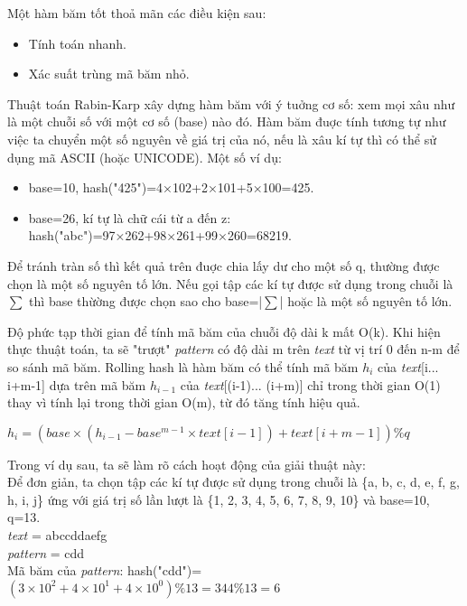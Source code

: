 \documentclass[a4paper,11pt]{article}
\begin{document}
\begin{enumerate}
			Một hàm băm tốt thoả mãn các điều kiện sau:
			\begin{itemize}
				\item Tính toán nhanh.
				\item Xác suất trùng mã băm nhỏ.
			\end{itemize}

			Thuật toán Rabin-Karp xây dựng hàm băm với ý tuởng cơ số: xem mọi xâu như là một chuỗi số với một cơ số (base) nào đó. Hàm băm đuợc tính tương tự như việc ta chuyển một số nguyên về giá trị của nó, nếu là xâu kí tự thì có thể sử dụng mã ASCII (hoặc UNICODE). Một số ví dụ:
			\begin{itemize}
			\item base=10, hash("425")=4×102+2×101+5×100=425.
			\item base=26, kí tự là chữ cái từ a đến z: hash("abc")=97×262+98×261+99×260=68219.
			\end{itemize}
			Để tránh tràn số thì kết quả trên đuợc chia lấy dư cho một số q, thường được chọn là một số nguyên tố lớn. Nếu gọi tập các kí tự được sử dụng trong chuỗi là $\sum$ thì base thừờng được chọn sao cho base=|$\sum$| hoặc là một số nguyên tố lớn.

			Độ phức tạp thời gian để tính mã băm của chuỗi độ dài k mất O(k). Khi hiện thực thuật toán, ta sẽ "trượt" \textit{pattern} có độ dài m trên \textit{text} từ vị trí 0 đến n-m để so sánh mã băm. Rolling hash là hàm băm có thể tính mã băm $h_i$ của \textit{text}[i... i+m-1] dựa trên mã băm $h_{i-1}$ của \textit{text}[(i-1)... (i+m)] chỉ trong thời gian O(1) thay vì tính lại trong thời gian O(m), từ đó tăng tính hiệu quả.

			$h_i=(base\times(h_{i-1}-base^{m-1}\times\textit{text}[i-1])+\textit{text}[i+m-1]) \% q$

			Trong ví dụ sau, ta sẽ làm rõ cách hoạt động của giải thuật này:\\
			Để đơn giản, ta chọn tập các kí tự được sử dụng trong chuỗi là \{a, b, c, d, e, f, g, h, i, j\} ứng với giá trị số lần lượt là \{1, 2, 3, 4, 5, 6, 7, 8, 9, 10\} và base=10, q=13.\\
			\textit{text} \hspace*{6mm}= abccddaefg\\
			\textit{pattern} \hspace*{0.3mm}= cdd\\
			Mã băm của \textit{pattern}: hash("cdd")=$(3\times10^2+4\times10^1+4\times10^0) \% 13=344 \% 13=6$


\end{enumerate}
\end{document}
